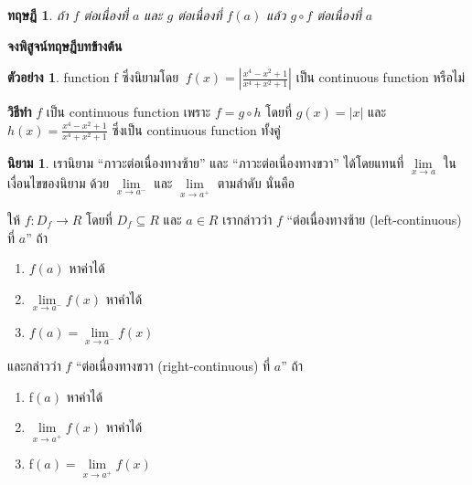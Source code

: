 \documentclass[
]{book}
\newtheorem{theorem}{ทฤษฎี}[chapter]
\theoremstyle{definition}
\newtheorem{definition}{นิยาม}[chapter]
\theoremstyle{definition}
\newtheorem{example}{ตัวอย่าง}[chapter]
\theoremstyle{definition}
\theoremstyle{definition}
\theoremstyle{remark}
\begin{document}
\begin{theorem}
\protect\hypertarget{thm:thm-cont-4}{}\label{thm:thm-cont-4}ถ้า \(f\) ต่อเนื่องที่ \(a\) และ \(g\) ต่อเนื่องที่ \(f(a)\) แล้ว \(g\circ f\) ต่อเนื่องที่ \(a\)
\end{theorem}

\textbf{จงพิสูจน์ทฤษฎีบทข้างต้น}

\begin{example}
\protect\hypertarget{exm:ex-cont-3}{}\label{exm:ex-cont-3}function f ซึ่งนิยามโดย
\(\ f\left( x\right) =\left| \frac{x^{4}-x^{2}+1}{x^{4}+x^{2}+1}\right|\)
เป็น continuous function หรือไม่
\end{example}

\textbf{วิธีทำ} \(f\) เป็น continuous function เพราะ \(f =g\circ h\) โดยที่
\(g\left( x\right) =\left| x\right|\) และ
\(h\left( x\right) =\frac{x^{4}-x^{2}+1}{x^{4}+x^{2}+1}\) ซึ่งเป็น continuous
function ทั้งคู่

\begin{definition}

เรานิยาม ``ภาวะต่อเนื่องทางซ้าย'' และ ``ภาวะต่อเนื่องทางขวา'' ได้โดยแทนที่
\(\underset{x\rightarrow a}{\lim}\) ในเงื่อนไขของนิยาม ด้วย
\(\underset{x\rightarrow a^{-}}{\lim}\) และ
\(\underset{x\rightarrow a^{+}}{\lim}\) ตามลำดับ นั่นคือ

ให้ \(f:D_{f}\rightarrow R\) โดยที่ \(D_{f}\subseteq R\) และ \(a\in R\) เรากล่าวว่า
\(f\) ``ต่อเนื่องทางซ้าย (left-continuous) ที่ \(a\)'' ถ้า

\begin{enumerate}
\def\labelenumi{\arabic{enumi}.}
\item
  \(f\left( a\right)\) หาค่าได้
\item
  \(\underset{x\rightarrow a^{-}}{\lim}f(x)\) หาค่าได้
\item
  \(f\left( a\right) =\underset{x\rightarrow a^{-}}{\lim}f(x)\)
\end{enumerate}

และกล่าวว่า \(f\) ``ต่อเนื่องทางขวา (right-continuous) ที่ \(a\)'' ถ้า

\begin{enumerate}
\def\labelenumi{\arabic{enumi}.}
\item
  f\(\left( a\right)\) หาค่าได้
\item
  \(\underset{x\rightarrow a^{+}}{\lim}f(x)\) หาค่าได้
\item
  f\(\left( a\right) =\underset{x\rightarrow a^{+}}{\lim}f(x)\)
\end{enumerate}

\end{definition}
\end{document}
